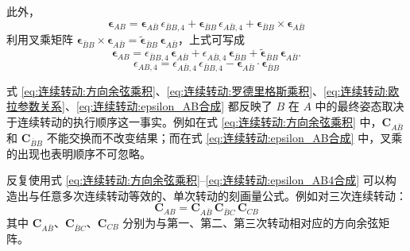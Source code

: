 此外，
\begin{equation}\label{eq:连续转动:epsilon_AB合成}
\bm{\epsilon}_{AB}=\bm{\epsilon}_{A\bar B}\,\epsilon_{\bar B B,4}+\bm{\epsilon}_{\bar B B}\,\epsilon_{A\bar B,4}+\bm{\epsilon}_{\bar B B}\times\bm{\epsilon}_{A\bar B}
\end{equation}
利用叉乘矩阵 $\bm{\epsilon}_{\bar B B}\times\bm{\epsilon}_{A\bar B}=\tilde{\bm{\epsilon}}_{\bar B B}\,\bm{\epsilon}_{A\bar B}$，上式可写成
\begin{equation}
\bm{\epsilon}_{AB}=\epsilon_{\bar B B,4}\,\bm{\epsilon}_{A\bar B}+\epsilon_{A\bar B,4}\,\bm{\epsilon}_{\bar B B}+\tilde{\bm{\epsilon}}_{\bar B B}\,\bm{\epsilon}_{A\bar B}.
\label{eq:连续转动:epsilon_AB合成矩阵}
\end{equation}
\begin{equation}\label{eq:连续转动:epsilon_AB4合成}
\epsilon_{AB,4}=\epsilon_{A\bar B,4}\,\epsilon_{\bar B B,4}-\bm{\epsilon}_{A\bar B}\cdot\bm{\epsilon}_{\bar B B}
\end{equation}

式 \eqref{eq:连续转动:方向余弦乘积}、\eqref{eq:连续转动:罗德里格斯乘积}、\eqref{eq:连续转动:欧拉参数关系}、\eqref{eq:连续转动:epsilon_AB合成} 都反映了 $B$ 在 $A$ 中的最终姿态取决于连续转动的执行顺序这一事实。例如在式 \eqref{eq:连续转动:方向余弦乘积} 中，$\bm{C}_{A\bar B}$ 和 $\bm{C}_{\bar B B}$ 不能交换而不改变结果；而在式 \eqref{eq:连续转动:epsilon_AB合成} 中，叉乘的出现也表明顺序不可忽略。

反复使用式 \eqref{eq:连续转动:方向余弦乘积}--\eqref{eq:连续转动:epsilon_AB4合成} 可以构造出与任意多次连续转动等效的、单次转动的刻画量公式。例如对三次连续转动：
$$
\bm{C}_{AB}=\bm{C}_{A\bar B}\,\bm{C}_{\bar B C}\,\bm{C}_{CB}
$$
其中 $\bm{C}_{A\bar B}$、$\bm{C}_{\bar B C}$、$\bm{C}_{CB}$ 分别为与第一、第二、第三次转动相对应的方向余弦矩阵。

